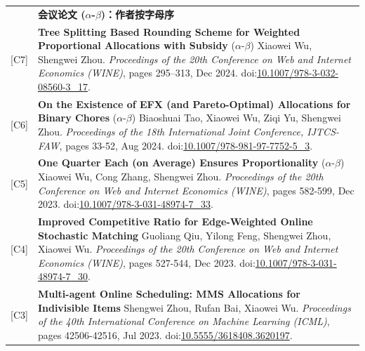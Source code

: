\documentclass[UTF8, fontset=none, letterpaper, 11pt]{ctexart}
\newcommand{\headingfont}{\Large\bfseries\color{OliveGreen}}
\newenvironment{SectionTable}[1]{
  \renewcommand*{\arraystretch}{1.2}
  \setlength{\tabcolsep}{10pt}
  \begin{longtable}{Rp{5.2in}} & #1 \\}
{\end{longtable}\vspace{-1cm}}
\begin{document}
\begin{SectionTable}{\headingfont 会议论文 \; \small\color{black}  ($\alpha$-$\beta$)：作者按字母序}
{\hypertarget{OR-WINE24}{[C7]}} &
\textbf{Tree Splitting Based Rounding Scheme for Weighted Proportional Allocations with Subsidy} \newline
($\alpha$-$\beta$) Xiaowei Wu, Shengwei Zhou.  \newline
\textit{Proceedings of the 20th Conference on Web and Internet Economics (WINE)}, pages 295--313, Dec 2024. doi:\href{https://link.springer.com/chapter/10.1007/978-3-032-08560-3_17}{10.1007/978-3-032-08560-3\_17}. \\

\vspace{-0.48cm}\hypertarget{EFX-IJTCS24}{[C6]} &
\textbf{On the Existence of EFX (and Pareto-Optimal) Allocations for Binary Chores} \newline
($\alpha$-$\beta$) Biaoshuai Tao, Xiaowei Wu, Ziqi Yu, Shengwei Zhou.  \newline
\textit{Proceedings of the 18th International Joint Conference, IJTCS-FAW}, pages 33-52, Aug 2024. doi:\href{https://link.springer.com/chapter/10.1007/978-981-97-7752-5_3}{10.1007/978-981-97-7752-5\_3}.\\

{\hypertarget{OR-WINE23}{[C5]}} &
\textbf{One Quarter Each (on Average) Ensures Proportionality} \newline
($\alpha$-$\beta$) Xiaowei Wu, Cong Zhang, Shengwei Zhou.  \newline
\textit{Proceedings of the 20th Conference on Web and Internet Economics (WINE)}, pages 582-599, Dec 2023. doi:\href{https://link.springer.com/chapter/10.1007/978-3-031-48974-7_33}{10.1007/978-3-031-48974-7\_33}.\\

{[C4]} &
\textbf{Improved Competitive Ratio for Edge-Weighted Online Stochastic Matching} \newline
Guoliang Qiu, Yilong Feng, Shengwei Zhou, Xiaowei Wu.  \newline
\textit{Proceedings of the 20th Conference on Web and Internet Economics (WINE)}, pages 527-544, Dec 2023. doi:\href{https://link.springer.com/chapter/10.1007/978-3-031-48974-7_30}{10.1007/978-3-031-48974-7\_30}.\\

{[C3]} &
\textbf{Multi-agent Online Scheduling: MMS Allocations for Indivisible Items } \newline
Shengwei Zhou, Rufan Bai, Xiaowei Wu.  \newline
\textit{Proceedings of the 40th International Conference on Machine Learning (ICML)}, pages 42506-42516, Jul 2023. doi:\href{https://dl.acm.org/doi/10.5555/3618408.3620197}{10.5555/3618408.3620197}.\\


\end{SectionTable}
\end{document}
